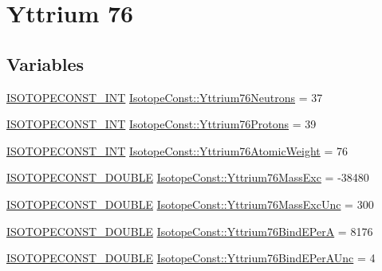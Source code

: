 \hypertarget{group___isotope_const-_yttrium-_y76}{}\section{Yttrium 76}
\label{group___isotope_const-_yttrium-_y76}
\subsection*{Variables}
\begin{DoxyCompactItemize}
\item 
\mbox{\hyperlink{group___isotope_const-_macros_ga5f18360b3e99483a35c32d789e62621c}{I\+S\+O\+T\+O\+P\+E\+C\+O\+N\+S\+T\+\_\+\+I\+NT}} \mbox{\hyperlink{group___isotope_const-_yttrium-_y76_ga164edba943948fd0395f7ad634c52eb7}{Isotope\+Const\+::\+Yttrium76\+Neutrons}} = 37
\item 
\mbox{\hyperlink{group___isotope_const-_macros_ga5f18360b3e99483a35c32d789e62621c}{I\+S\+O\+T\+O\+P\+E\+C\+O\+N\+S\+T\+\_\+\+I\+NT}} \mbox{\hyperlink{group___isotope_const-_yttrium-_y76_ga3faf98253b6a4555d810402df64adfed}{Isotope\+Const\+::\+Yttrium76\+Protons}} = 39
\item 
\mbox{\hyperlink{group___isotope_const-_macros_ga5f18360b3e99483a35c32d789e62621c}{I\+S\+O\+T\+O\+P\+E\+C\+O\+N\+S\+T\+\_\+\+I\+NT}} \mbox{\hyperlink{group___isotope_const-_yttrium-_y76_gaa10c2201465fd8f8130b67167491244c}{Isotope\+Const\+::\+Yttrium76\+Atomic\+Weight}} = 76
\item 
\mbox{\hyperlink{group___isotope_const-_macros_ga8f45a7272ce02c0b4c65c44636ed719a}{I\+S\+O\+T\+O\+P\+E\+C\+O\+N\+S\+T\+\_\+\+D\+O\+U\+B\+LE}} \mbox{\hyperlink{group___isotope_const-_yttrium-_y76_ga1978d968a3e457bd43880069e78c425d}{Isotope\+Const\+::\+Yttrium76\+Mass\+Exc}} = -\/38480
\item 
\mbox{\hyperlink{group___isotope_const-_macros_ga8f45a7272ce02c0b4c65c44636ed719a}{I\+S\+O\+T\+O\+P\+E\+C\+O\+N\+S\+T\+\_\+\+D\+O\+U\+B\+LE}} \mbox{\hyperlink{group___isotope_const-_yttrium-_y76_ga6757b7b5540a40a5ef5b59196b97b68c}{Isotope\+Const\+::\+Yttrium76\+Mass\+Exc\+Unc}} = 300
\item 
\mbox{\hyperlink{group___isotope_const-_macros_ga8f45a7272ce02c0b4c65c44636ed719a}{I\+S\+O\+T\+O\+P\+E\+C\+O\+N\+S\+T\+\_\+\+D\+O\+U\+B\+LE}} \mbox{\hyperlink{group___isotope_const-_yttrium-_y76_ga98dd10ea5ed0631697b21dc17079f53f}{Isotope\+Const\+::\+Yttrium76\+Bind\+E\+PerA}} = 8176
\item 
\mbox{\hyperlink{group___isotope_const-_macros_ga8f45a7272ce02c0b4c65c44636ed719a}{I\+S\+O\+T\+O\+P\+E\+C\+O\+N\+S\+T\+\_\+\+D\+O\+U\+B\+LE}} \mbox{\hyperlink{group___isotope_const-_yttrium-_y76_ga7cf87ce46ace338c1645baeabe9cce7d}{Isotope\+Const\+::\+Yttrium76\+Bind\+E\+Per\+A\+Unc}} = 4

\end{DoxyCompactItemize}
